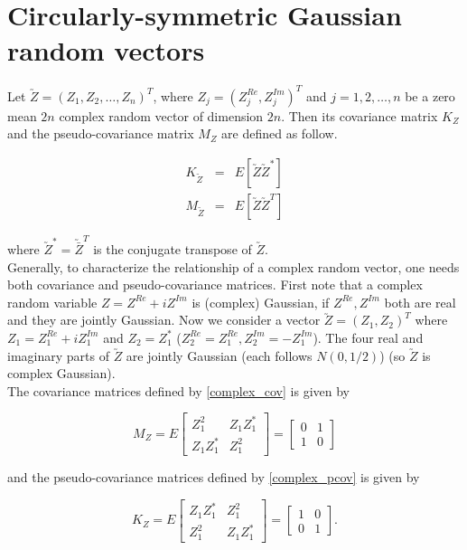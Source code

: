 \section{Circularly-symmetric Gaussian random vectors}

Let $\utilde{Z} = (Z_1, Z_2, \ldots, Z_n)^T$, where $Z_j = (Z_j^{Re}, Z_j^{Im})^T$ and $j=1,2,\ldots, n$ be a zero mean $2n$ complex random vector of dimension $2n$. Then its covariance matrix $K_Z$ and the pseudo-covariance matrix $M_Z$ are defined as follow.

\begin{eqnarray}
\label{complex_cov}
K_{\utilde{Z}} &=& E[\utilde{Z}\utilde{Z}^*]\\
\label{complex_pcov}
M_{\utilde{Z}} &=& E[\utilde{Z}\utilde{Z}^T]
\end{eqnarray}

where $\utilde{Z}^* = \utilde{\bar{Z}}^T$ is the conjugate transpose of $\utilde{Z}$.\\

Generally, to characterize the relationship of a complex random vector, one needs both covariance and pseudo-covariance matrices. First note that a complex random variable $Z = Z^{Re} + iZ^{Im}$ is (complex) Gaussian, if $Z^{Re}, Z^{Im}$ both are real and they are jointly Gaussian. Now we consider a vector $\utilde{Z}=(Z_1, Z_2)^T$ where $Z_1=Z_1^{Re }+i Z_1^{Im}$ and $Z_2=Z_1^*$ ($Z_2^{Re}=Z_1^{Re }, Z_2^{Im}=-Z_1^{Im}$). The four real and imaginary parts of $\utilde{Z}$ are jointly Gaussian (each follows $N(0,1/2)$) (so $\utilde{Z}$ is complex Gaussian). \\

The covariance matrices defined by \eqref{complex_cov} is given by

\[
M_Z = E \begin{bmatrix}
Z_1^2 & Z_1Z_1^*\\
Z_1Z_1^* & Z_1^2
\end{bmatrix} =
\begin{bmatrix}
0 & 1\\
1 & 0
\end{bmatrix}
\]

and the pseudo-covariance matrices defined by \eqref{complex_pcov} is given by

\[
K_Z= E \begin{bmatrix}
Z_1Z_1^*  & Z_1^2\\
Z_1^2     & Z_1Z_1^*
\end{bmatrix} =
\begin{bmatrix}
1 & 0\\
0 & 1
\end{bmatrix}.
\]

